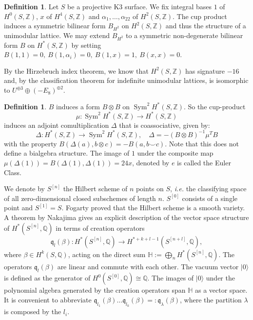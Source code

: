 \documentclass{amsart}
\DeclareMathOperator{\Sym}{Sym}
\newcommand{\hilb}[1]{^{[#1]}}
\newcommand{\ie}{{\it i.e. }}
\newcommand{\vac}{|0\rangle}
\newcommand{\One}{1}
\newcommand{\IQ}{\mathbb{Q}}
\newcommand{\IZ}{\mathbb{Z}}
\newcommand{\kq}{\mathfrak{q}}
\theoremstyle{plain}
\theoremstyle{definition}
\newtheorem{definition}[theorem]{Definition}
\theoremstyle{remark}
\begin{document}
\begin{definition}
Let $S$ be a projective K3 surface. We fix integral bases $\One$ of $H^0(S,\IZ)$, $x$ of $H^4(S,\IZ)$ and $\alpha_1,\ldots ,\alpha_{22}$ of $H^2(S,\IZ)$. The cup product induces a symmetric bilinear form $B_{H^2}$ on $H^2(S,\IZ)$ and thus the structure of a unimodular lattice.
We may extend $B_{H^2}$ to a symmetric non-degenerate bilinear form $B$ on $H^\ast(S,\IZ)$ by setting $ B(\One,\One) = 0,\ B(\One,\alpha_i) = 0,\ B(\One,x) = 1, \ B(x,x) = 0$.
\end{definition}
By the Hirzebruch index theorem, we know that $H^2(S,\IZ)$ has signature $-16$ and, by the classification theorem for indefinite unimodular lattices, is isomorphic to $U^{\oplus 3}\oplus (-E_8)^{\oplus 2}$.
\begin{definition}
$B$ induces a form $B\otimes B$ on $\Sym^2H^\ast(S,\IZ)$. So the cup-product 
\begin{equation*}
\mu : \Sym ^2H^{*}(S,\IZ) \longrightarrow H^\ast(S,\IZ) 
\end{equation*}
induces an adjoint comultiplication $\Delta$ that is coassociative, given by:
\begin{equation*}
\Delta : H^\ast(S,\IZ) \longrightarrow \Sym^2H^\ast(S,\IZ),\quad \Delta = -(B\otimes B)^{-1}\mu^TB
\end{equation*}
with the property $B\left(\Delta(a),b\otimes c\right)=-B\left(a,b\smile c\right)$. Note that this does not define a bialgebra structure.
The image of $\One$ under the composite map $\mu(\Delta(\One)) = B(\Delta(\One),\Delta(\One)) = 24 x$, denoted by $e$ is called the Euler Class.
\end{definition}
We denote by $S\hilb{n}$ the Hilbert scheme of $n$ points on $S$, \ie the classifying space of all zero-dimensional closed subschemes of length $n$. $S\hilb{0}$ consists of a single point and $S\hilb{1}=S$. Fogarty proved that the Hilbert scheme is a smooth variety.
A theorem by Nakajima gives an explicit description of the vector space structure of $H^\ast(S\hilb{n},\IQ)$ in terms of creation operators
$$
\kq_l(\beta) :  H^\ast(S\hilb{n},\IQ) \longrightarrow  H^{\ast+k+l-1}(S\hilb{n+l},\IQ)
,$$ 
where $\beta\in H^k(S,\IQ)$, acting on the direct sum 
$\mathbb{H}:=\bigoplus_n H^\ast(S\hilb{n},\IQ)$. The operators $\kq_l(\beta)$ are linear and commute with each other. The vacuum vector $\vac$ is defined as the generator of $H^0(S\hilb{0},\IQ)\cong\IQ$. The images of $\vac$ under the polynomial algebra generated by the creation operators span $\mathbb{H}$ as a vector space. 
It is convenient to abbreviate $\kq_{l_1}(\beta)\ldots\kq_{l_k}(\beta)=:\kq_\lambda(\beta)$, where the partition $\lambda$ is composed by the $l_i$. 
\end{document}
